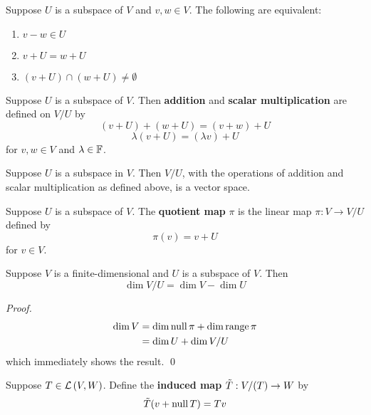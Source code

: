 \begin{theorem}
   Suppose $U$ is a subspace of $V$ and $v, w \in V$. The following are equivalent:
   \begin{enumerate}
      \item $v - w \in U$
      \item $v + U = w + U$
      \item $(v + U) \cap (w + U) \neq \emptyset$
   \end{enumerate}
\end{theorem}

\begin{definition} 
   Suppose $U$ is a subspace of $V$. Then \textbf{addition} and
   \textbf{scalar multiplication} are defined on $V / U$ by
   \[ (v + U) + (w + U) = (v + w) + U \]
   \[ \lambda(v + U) = (\lambda v) + U \]
   for $v, w \in V$ and $\lambda \in \operatorname{\mathbb{F}}$.
\end{definition}

\begin{theorem} 
   Suppose $U$ is a subspace in $V$. Then $V/U$, with the operations
   of addition and scalar multiplication as defined above,
   is a vector space.
\end{theorem}

\begin{definition} 
   Suppose $U$ is a subspace of $V$. The \textbf{quotient map} $\pi$
   is the linear map $\pi : V \to V/U$ defined by
   \[ \pi(v) = v + U \]
   for $v \in V$.
\end{definition}

\begin{theorem} 
   Suppose $V$ is a finite-dimensional and $U$ is a subspace of $V$. Then
   \[ \dim V/U = \dim V - \dim U \]

   \begin{proof}
      \begin{align*}
         \dim V &= \dim \operatorname{null} \pi + \dim \operatorname{range} \pi \\
         &= \dim U + \dim V/U
      \end{align*}
      which immediately shows the result. \qed
   \end{proof}
\end{theorem}

\begin{definition} 
   Suppose $T \in \mathcal{L} \left( V, W \right)$. Define the \textbf{induced map} $\tilde{T} : V / (\null T) \to W$ by
   \[ \tilde{T}(v + \operatorname{null} T) = Tv \]
\end{definition}

